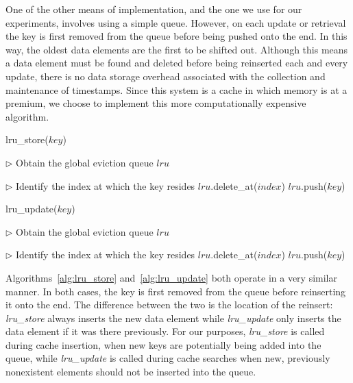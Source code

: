 One of the other means of implementation, and the one we use for our
experiments, involves using a simple queue. However, on each update or
retrieval the key is first removed from the queue before being pushed onto the
end. In this way, the oldest data elements are the first to be shifted out.
Although this means a data element must be found and deleted before being
reinserted each and every update, there is no data storage overhead associated
with the collection and maintenance of timestamps. Since this system is a cache
in which memory is at a premium, we choose to implement this more
computationally expensive algorithm.

\begin{algorithm}[htp]
\small
\caption{\label{alg:lru_store}lru\_store($key$)}
\begin{algorithmic}[1]
\STATE $\triangleright$ Obtain the global eviction queue $lru$

\STATE $\triangleright$ Identify the index at which the key resides
  \STATE $lru$.delete\_at($index$)
\ENDIF
\STATE $lru$.push($key$)
\end{algorithmic}
\end{algorithm}

\begin{algorithm}[htp]
\small
\caption{\label{alg:lru_update}lru\_update($key$)}
\begin{algorithmic}[1]
\STATE $\triangleright$ Obtain the global eviction queue $lru$

\STATE $\triangleright$ Identify the index at which the key resides
  \STATE $lru$.delete\_at($index$)
  \STATE $lru$.push($key$)
\ENDIF
\end{algorithmic}
\end{algorithm}

Algorithms~\ref{alg:lru_store} and~\ref{alg:lru_update} both operate in a very
similar manner. In both cases, the key is first removed from the queue before
reinserting it onto the end. The difference between the two is the location of
the reinsert: \emph{lru\_store} always inserts the new data element while
\emph{lru\_update} only inserts the data element if it was there previously.
For our purposes, \emph{lru\_store} is called during cache insertion, when new
keys are potentially being added into the queue, while \emph{lru\_update} is
called during cache searches when new, previously nonexistent elements should
not be inserted into the queue.

